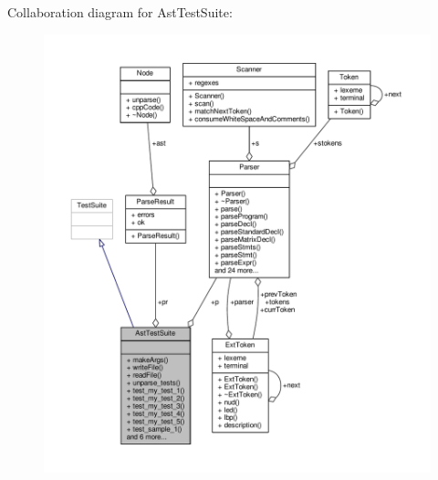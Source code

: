 Collaboration diagram for Ast\-Test\-Suite\-:\nopagebreak
\begin{figure}[H]
\begin{center}
\leavevmode
\includegraphics[width=350pt]{classAstTestSuite__coll__graph}
\end{center}
\end{figure}
